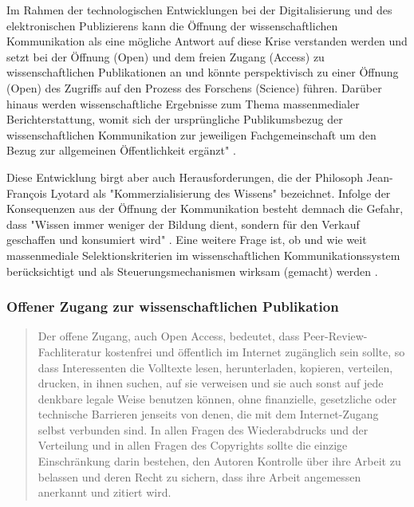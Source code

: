 Im Rahmen der technologischen Entwicklungen bei der Digitalisierung und des elektronischen Publizierens kann die Öffnung der wissenschaftlichen Kommunikation als eine mögliche Antwort auf diese Krise verstanden werden und setzt bei der Öffnung (Open) und dem freien Zugang (Access) zu wissenschaftlichen Publikationen an und könnte perspektivisch zu einer Öffnung (Open) des Zugriffs auf den Prozess des Forschens (Science) führen. Darüber hinaus werden wissenschaftliche Ergebnisse zum Thema massenmedialer Berichterstattung, womit sich der ursprüngliche Publikumsbezug der wissenschaftlichen Kommunikation zur jeweiligen Fachgemeinschaft um den Bezug zur allgemeinen Öffentlichkeit ergänzt" \cite{bbaw_publizieren_2015} .

Diese Entwicklung birgt aber auch Herausforderungen, die der Philosoph Jean-François Lyotard als "Kommerzialisierung des Wissens" \cite{Das_postmoderne_Wissen_Ein_Bericht} bezeichnet. Infolge der Konsequenzen aus der Öffnung der Kommunikation besteht demnach die Gefahr, dass "Wissen immer weniger der Bildung dient, sondern für den Verkauf geschaffen und konsumiert wird" \cite{hagner_2015_sache_buches}. Eine weitere Frage ist, ob und wie weit massenmediale Selektionskriterien im wissenschaftlichen Kommunikationssystem berücksichtigt und als Steuerungsmechanismen wirksam (gemacht) werden \cite{bbaw_publizieren_2015}.

\subsubsection{Offener Zugang zur wissenschaftlichen Publikation}

\begin{quote}
Der offene Zugang, auch Open Access, bedeutet, dass Peer-Review-Fachliteratur kostenfrei und öffentlich im Internet zugänglich sein sollte, so dass Interessenten die Volltexte lesen, herunterladen, kopieren, verteilen, drucken, in ihnen suchen, auf sie verweisen und sie auch sonst auf jede denkbare legale Weise benutzen können, ohne finanzielle, gesetzliche oder technische Barrieren jenseits von denen, die mit dem Internet-Zugang selbst verbunden sind. In allen Fragen des Wiederabdrucks und der Verteilung und in allen Fragen des Copyrights sollte die einzige Einschränkung darin bestehen, den Autoren Kontrolle über ihre Arbeit zu belassen und deren Recht zu sichern, dass ihre Arbeit angemessen anerkannt und zitiert wird.
\cite{boai_2012}
\end{quote}


